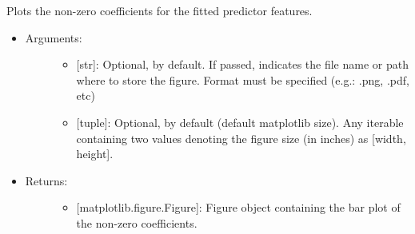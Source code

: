 \documentclass[letterpaper,10pt,english]{sphinxmanual}
\begin{document}
\begin{fulllineitems}
\begin{fulllineitems}
\label{\detokenize{models:data_tools.models.Lasso.plot_coef}}
Plots the non-zero coefficients for the fitted predictor
features.
\begin{itemize}
\item {} \begin{description}
\item[{Arguments:}] \leavevmode\begin{itemize}
\item {} 
 {[}str{]}: Optional,  by default. If
passed, indicates the file name or path where to store the
figure. Format must be specified (e.g.: .png, .pdf, etc)

\item {} 
 {[}tuple{]}: Optional,  by default (default
matplotlib size). Any iterable containing two values
denoting the figure size (in inches) as {[}width, height{]}.

\end{itemize}

\end{description}

\item {} \begin{description}
\item[{Returns:}] \leavevmode\begin{itemize}
\item {} 
{[}matplotlib.figure.Figure{]}: Figure object containing the
bar plot of the non-zero coefficients.

\end{itemize}

\end{description}

\end{itemize}

\end{fulllineitems}



\end{fulllineitems}
\end{document}
